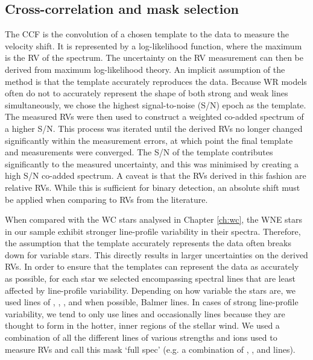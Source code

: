 \subsection{Cross-correlation and mask selection}
The CCF is the convolution of a chosen template to the data to measure the velocity shift. It is represented by a log-likelihood function, where the maximum is the RV of the spectrum. The uncertainty on the RV measurement can then be derived from maximum log-likelihood theory. An implicit assumption of the method is that the template accurately reproduces the data. Because WR models often do not to accurately represent the shape of both strong and weak lines simultaneously, we chose the highest signal-to-noise (S/N) epoch as the template. The measured RVs were then used to construct a weighted co-added spectrum of a higher S/N. This process was iterated until the derived RVs no longer changed significantly within the measurement errors, at which point the final template and measurements were converged. The S/N of the template contributes significantly to the measured uncertainty, and this was minimised by creating a high S/N co-added spectrum. A caveat is that the RVs derived in this fashion are relative RVs. While this is sufficient for binary detection, an absolute shift must be applied when comparing to RVs from the literature.

When compared with the WC stars analysed in Chapter \ref{ch:wc}, the WNE stars in our sample exhibit stronger line-profile variability in their spectra. Therefore, the assumption that the template accurately represents the data often breaks down for variable stars. This directly results in larger uncertainties on the derived RVs. In order to ensure that the templates can represent the data as accurately as possible, for each star we selected encompassing spectral lines that are least affected by line-profile variability. Depending on how variable the stars are, we used lines of \niv, \nv, \heii,{} and when possible, Balmer lines. In cases of strong line-profile variability, we tend to only use \nv{} lines and occasionally \niv{} lines because they are thought to form in the hotter, inner regions of the stellar wind. We used a combination of all the different lines of various strengths and ions used to measure RVs and call this mask `full spec' (e.g. a combination of \nv{}, \niv,{} and \heii{} lines).

